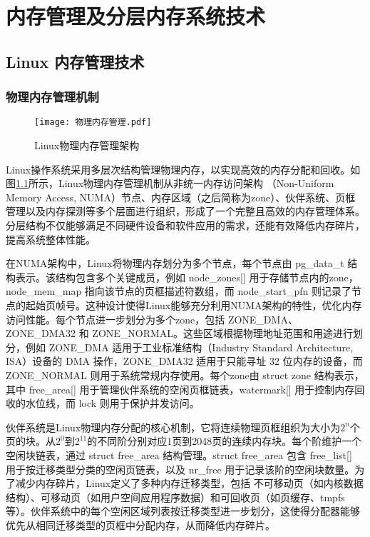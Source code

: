 \chapter{内存管理及分层内存系统技术}

\section{Linux 内存管理技术}

\subsection{物理内存管理机制}

\begin{figure}[htb]
    \centering
    \texttt{[image: 物理内存管理.pdf]}
    \caption{Linux物理内存管理架构}
    \label{物理内存管理}
\end{figure}

Linux操作系统采用多层次结构管理物理内存，以实现高效的内存分配和回收。如图\ref{物理内存管理}所示，Linux物理内存管理机制从非统一内存访问架构 （Non-Uniform Memory Access, NUMA）节点、内存区域（之后简称为zone）、伙伴系统、页框管理以及内存探测等多个层面进行组织，形成了一个完整且高效的内存管理体系。分层结构不仅能够满足不同硬件设备和软件应用的需求，还能有效降低内存碎片，提高系统整体性能。

在NUMA架构中，Linux将物理内存划分为多个节点，每个节点由 pg\_data\_t 结构表示。该结构包含多个关键成员，例如 node\_zones[] 用于存储节点内的zone，node\_mem\_map 指向该节点的页框描述符数组，而 node\_start\_pfn 则记录了节点的起始页帧号。这种设计使得Linux能够充分利用NUMA架构的特性，优化内存访问性能。每个节点进一步划分为多个zone，包括 ZONE\_DMA、ZONE\_DMA32 和 ZONE\_NORMAL。这些区域根据物理地址范围和用途进行划分，例如 ZONE\_DMA 适用于工业标准结构（Industry Standard Architecture, ISA）设备的 DMA 操作，ZONE\_DMA32 适用于只能寻址 32 位内存的设备，而 ZONE\_NORMAL 则用于系统常规内存使用。每个zone由 struct zone 结构表示，其中 free\_area[] 用于管理伙伴系统的空闲页框链表，watermark[] 用于控制内存回收的水位线，而 lock 则用于保护并发访问。

伙伴系统是Linux物理内存分配的核心机制，它将连续物理页框组织为大小为\(2^n\)个页的块。从\(2^0\)到\(2^{11}\)的不同阶分别对应1页到2048页的连续内存块。每个阶维护一个空闲块链表，通过 struct free\_area 结构管理。struct free\_area 包含 free\_list[] 用于按迁移类型分类的空闲页链表，以及 nr\_free 用于记录该阶的空闲块数量。为了减少内存碎片，Linux定义了多种内存迁移类型，包括 不可移动页（如内核数据结构）、可移动页（如用户空间应用程序数据）和可回收页（如页缓存、tmpfs等）。伙伴系统中的每个空闲区域列表按迁移类型进一步划分，这使得分配器能够优先从相同迁移类型的页框中分配内存，从而降低内存碎片。

